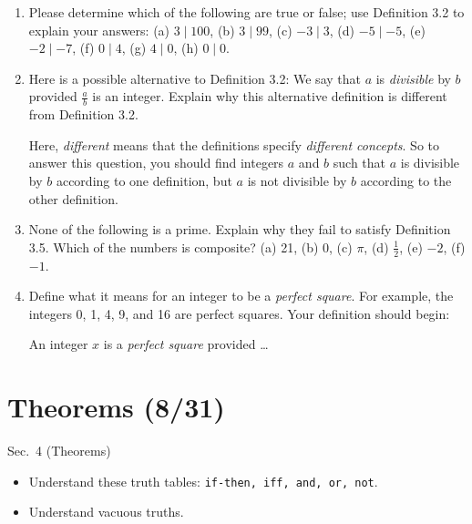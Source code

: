 \documentclass[11pt]{article}
\newcommand{\half}{\frac{1}{2}}
\begin{document}
\begin{enumerate}
\item Please determine which of the following are true or false; use Definition 3.2 to explain your answers: (a) $3 \mid 100$, (b) $3 \mid 99$, (c) $-3 \mid 3$, (d) $-5 \mid -5$, (e) $-2 \mid -7$, (f) $0 \mid 4$, (g) $4 \mid 0$, (h) $0 \mid 0$.
\item Here is a possible alternative to Definition 3.2: We say that $a$ is \textit{divisible} by $b$ provided $\frac{a}{b}$ is an integer. Explain why this alternative definition is different from Definition 3.2.

Here, \textit{different} means that the definitions specify \textit{different concepts}. So to answer this question, you should find integers $a$ and $b$ such that $a$ is divisible by $b$ according to one definition, but $a$ is not divisible by $b$ according to the other definition.
\item None of the following is a prime. Explain why they fail to satisfy Definition 3.5. Which of the numbers is composite? (a) 21, (b) 0, (c) $\pi$, (d) $\half$, (e) $-2$, (f) $-1$.
\item Define what it means for an integer to be a \textit{perfect square}. For example, the integers 0, 1, 4, 9, and 16 are perfect squares. Your definition should begin:

\hspace{0.5cm} An integer $x$ is a \textit{perfect square} provided \ldots
\end{enumerate}

\section*{Theorems (8/31)}
\begin{textbook}{Sec.~4 (Theorems)}
\begin{itemize}[leftmargin=*, nosep]
\item Understand these truth tables: \texttt{if-then, iff, and, or, not}.
\item Understand vacuous truths.
\end{itemize}
\end{textbook}
\end{document}
